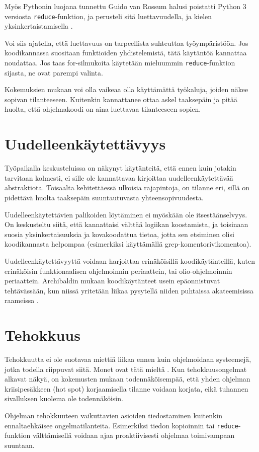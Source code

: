 Myös Pythonin luojana tunnettu Guido van Rossum halusi poistatti Python 3 versiosta \texttt{reduce}-funktion, ja perusteli sitä luettavuudella, ja kielen yksinkertaistamisella \cite{vanrossum2008reduce}.

Voi siis ajatella, että luettavuus on tarpeellista suhteuttaa työympäristöön. Jos koodikannassa suositaan funktioiden yhdistelemistä, tätä käytäntöä kannattaa noudattaa. Jos taas for-silmukoita käytetään mieluummin \texttt{reduce}-funktion sijasta, ne ovat parempi valinta.

Kokemuksien mukaan voi olla vaikeaa olla käyttämättä työkaluja, joiden näkee sopivan tilanteeseen. Kuitenkin kannattanee ottaa askel taaksepäin ja pitää huolta, että ohjelmakoodi on aina luettavaa tilanteeseen sopien.

\section{Uudelleenkäytettävyys}

Työpaikalla keskusteluissa on näkynyt käytänteitä, että ennen kuin jotakin tarvitaan kolmesti, ei sille ole kannattavaa kirjoittaa uudelleenkäytettävää abstraktiota. Toisaalta kehitettäessä ulkoisia rajapintoja, on tilanne eri, sillä on pidettävä huolta taaksepäin suuntautuvasta yhteensopivuudesta.

Uudelleenkäytettävien palikoiden löytäminen ei myöskään ole itsestäänselvyys. On keskusteltu siitä, että kannattaisi välttää logiikan koostamista, ja toisinaan suosia yksinkertaisuuksia ja kovakoodattua tietoa, jotta sen etsiminen olisi koodikannasta helpompaa (esimerkiksi käyttämällä grep-komentorivikomentoa).

Uudelleenkäytettävyyttä voidaan harjoittaa erinäköisillä koodikäytänteillä, kuten erinäköisin funktionaalisen ohjelmoinnin periaattein, tai olio-ohjelmoinnin periaattein. Archibaldin mukaan koodikäytänteet usein epäonnistuvat tehtävässään, kun niissä yritetään liikaa pysytellä niiden puhtaissa akateemisissa raameissa \cite{pennane_fp_gist}.



\section{Tehokkuus}
Tehokkuutta ei ole suotavaa miettiä liikaa ennen kuin ohjelmoidaan systeemejä, jotka todella riippuvat siitä. Monet ovat tätä mieltä \cite{pennane_fp_gist,prematureoptimization}. Kun tehokkuusongelmat alkavat näkyä, on kokemusten mukaan todennäköisempää, että yhden ohjelman kriisipesäkkeen (hot spot) korjaamisella tilanne voidaan korjata, eikä tuhannen sivalluksen kuolema ole todennäköisin.

Ohjelman tehokkuuteen vaikuttavien asioiden tiedostaminen kuitenkin ennaltaehkäisee ongelmatilanteita. Esimerkiksi tiedon kopioinnin tai \texttt{reduce}-funktion välttämisellä voidaan ajaa proaktiivisesti ohjelmaa toimivampaan suuntaan.

